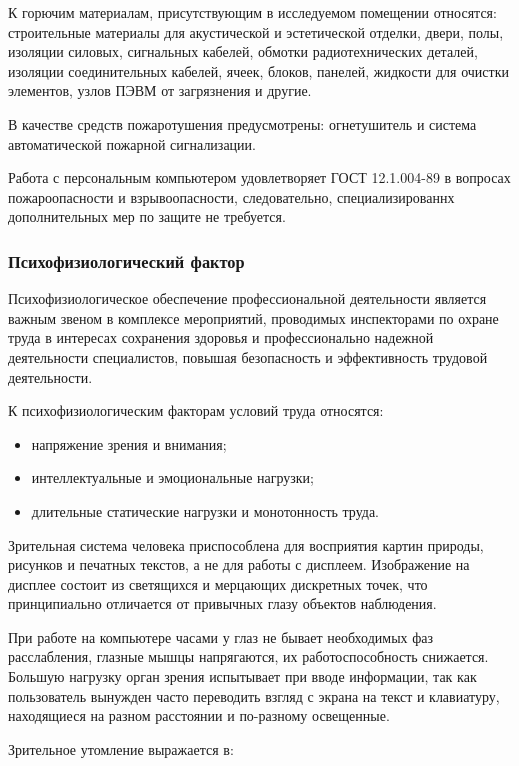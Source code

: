 К горючим материалам, присутствующим в исследуемом помещении относятся: строительные материалы для акустической и эстетической отделки, двери, полы, изоляции силовых, сигнальных кабелей, обмотки радиотехнических деталей, изоляции соединительных кабелей, ячеек, блоков, панелей, жидкости для очистки элементов, узлов ПЭВМ от загрязнения и другие.

В качестве средств пожаротушения предусмотрены: огнетушитель и система автоматической пожарной сигнализации.

Работа с персональным компьютером удовлетворяет ГОСТ 12.1.004-89 в вопросах пожароопасности и взрывоопасности, следовательно, специализированнх дополнительных мер по защите не требуется.

\subsubsection{Психофизиологический фактор}

Психофизиологическое обеспечение профессиональной деятельности является важным звеном в комплексе мероприятий, проводимых инспекторами по охране труда в интересах сохранения здоровья и профессионально надежной деятельности специалистов, повышая безопасность и эффективность трудовой деятельности. 

К психофизиологическим факторам условий труда относятся: 

\begin{itemize}
  \item напряжение зрения и внимания;
  \item интеллектуальные и эмоциональные нагрузки;
  \item длительные статические нагрузки и монотонность труда.
\end{itemize}

Зрительная система человека приспособлена для восприятия картин природы, рисунков и печатных текстов, а не для работы с дисплеем. Изображение на дисплее состоит из светящихся и мерцающих дискретных точек, что принципиально отличается от привычных глазу объектов наблюдения.

При работе на компьютере часами у глаз не бывает необходимых фаз расслабления, глазные мышцы напрягаются, их работоспособность снижается. Большую нагрузку орган зрения испытывает при вводе информации, так как пользователь вынужден часто переводить взгляд с экрана на текст и клавиатуру, находящиеся на разном расстоянии и по-разному освещенные. 

Зрительное утомление выражается в:

